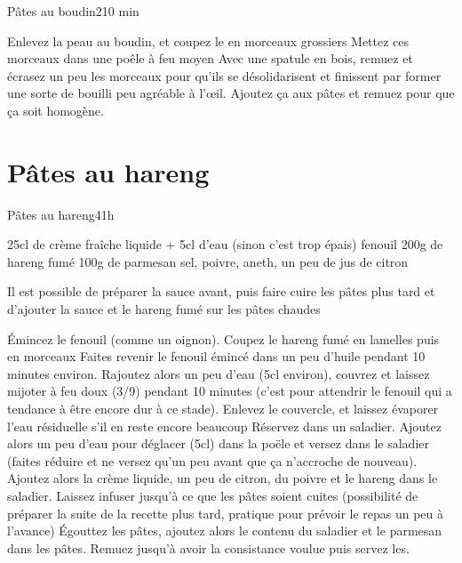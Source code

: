 {\begin{recette}{Pâtes au boudin}{2}{10 min}{}
\begin{preparation}
\etape Enlevez la peau au boudin, et coupez le en morceaux grossiers
\etape Mettez ces morceaux dans une poêle à feu moyen
\etape Avec une spatule en bois, remuez et écrasez un peu les morceaux pour qu'ils se désolidarisent et finissent par former une 
sorte de bouilli peu agréable à l'œil.
\etape Ajoutez ça aux pâtes et remuez pour que ça soit homogène.
\end{preparation}
\end{recette}

\section{Pâtes au hareng}
\begin{recette}{Pâtes au hareng}{4}{1h}{}
\begin{ingredients}
\ingredient 25cl de crème fraîche liquide + 5cl d'eau (sinon c'est trop épais)
 fenouil
\ingredient 200g de hareng fumé
\ingredient 100g de parmesan
\ingredient sel, poivre, aneth, un peu de jus de citron
\end{ingredients}

\begin{remarque}
Il est possible de préparer la sauce avant, puis faire cuire les pâtes plus tard et d'ajouter la sauce et le hareng fumé sur les pâtes chaudes
\end{remarque}


\begin{preparation}
\etape Émincez le fenouil (comme un oignon). Coupez le hareng fumé en lamelles puis en morceaux
\etape Faites revenir le fenouil émincé dans un peu d'huile pendant 10 minutes environ.
\etape Rajoutez alors un peu d'eau (5cl environ), couvrez et laissez mijoter à feu doux (3/9) pendant 10 minutes (c'est pour attendrir le fenouil qui a tendance à être encore dur à ce stade).
\etape Enlevez le couvercle, et laissez évaporer l'eau résiduelle s'il en reste encore beaucoup
\etape Réservez dans un saladier. 
\etape Ajoutez alors un peu d'eau pour déglacer (5cl) dans la poële et versez dans le saladier (faites réduire et ne versez qu'un peu avant que ça n'accroche de nouveau). 
\etape Ajoutez alors la crème liquide, un peu de citron, du poivre et le hareng dans le saladier. 
\etape Laissez infuser jusqu'à ce que les pâtes soient cuites (possibilité de préparer la suite de la recette plus tard, pratique pour prévoir le repas un peu à l'avance)
\etape Égouttez les pâtes, ajoutez alors le contenu du saladier et le parmesan dans les pâtes. 
\etape Remuez jusqu'à avoir la consistance voulue puis servez les.
\end{preparation}
\end{recette}

}
